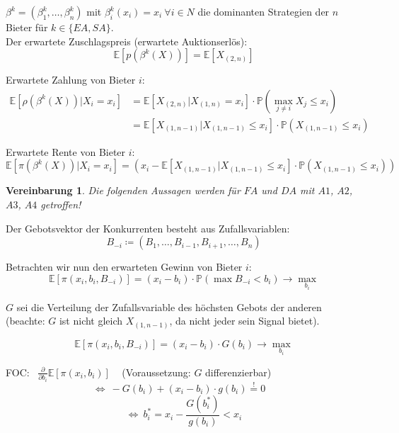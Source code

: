 \documentclass[12pt]{extreport} %
\theoremstyle{named}
\theoremstyle{nnamed}
\theoremstyle{itshape}
\theoremstyle{normal}
\newtheorem*{vereinbarung}{Vereinbarung}
\begin{document}
$\beta^{k} = \left(\beta_{1}^{k}, \dotsc, \beta_{n}^{k} \right)$ mit $\beta_{i}^{k}(x_{i}) = x_{i} ~\forall i \in N$ die dominanten Strategien der $n$ Bieter für $k \in \{ EA, SA \}$. \\

Der erwartete Zuschlagspreis (erwartete Auktionserlös):
	$$ \mathbb{E}\left[ p\left(\beta^{k}(X) \right) \right] = \mathbb{E}[X_{(2,n)}] $$
	
Erwartete Zahlung von Bieter $i$:
	\begin{align*}
		\mathbb{E}\left[ \rho\left( \beta^{k}(X) \right) \big| X_{i} = x_{i} \right] & = \mathbb{E}\left[ X_{(2,n)} \big| X_{(1, n)} = x_{i} \right] \cdot \mathbb{P}\left( \max_{j\neq i} X_{j} \leq x_{i} \right) \\
			& = \mathbb{E}\left[ X_{(1,n-1)} \big| X_{(1, n-1)} \leq x_{i} \right] \cdot \mathbb{P}\left( X_{(1, n-1)} \leq x_{i} \right)
	\end{align*}
	
Erwartete Rente von Bieter $i$:
$$ \mathbb{E}\left[ \pi\left( \beta^{k}(X) \right) \big| X_{i} = x_{i} \right] = \left( x_{i} - \mathbb{E} \left[ X_{(1, n-1)} \big| X_{(1, n-1)} \leq x_{i} \right] \cdot \mathbb{P}\left( X_{(1,n-1)} \leq x_{i} \right) \right) $$

\begin{vereinbarung}
	Die folgenden Aussagen werden für $FA$ und $DA$ mit $A1$, $A2$, $A3$, $A4$ getroffen!
\end{vereinbarung}

Der Gebotsvektor der Konkurrenten besteht aus Zufallsvariablen:
	$$ B_{-i} \coloneqq \left(B_{1}, \dotsc, B_{i-1}, B_{i+1}, \dotsc, B_{n} \right) $$

Betrachten wir nun den erwarteten Gewinn von Bieter $i$:
$$ \mathbb{E}[\pi\left( x_{i}, b_{i}, B_{-i} \right)] = (x_{i} - b_{i}) \cdot \mathbb{P}\left( \max B_{-i} < b_{i} \right) \longrightarrow \max_{b_{i}} $$

$G$ sei die Verteilung der Zufallsvariable des höchsten Gebots der anderen (beachte: $G$ ist nicht gleich $X_{(1, n-1)}$, da nicht jeder sein Signal bietet).

$$ \mathbb{E}[\pi\left( x_{i}, b_{i}, B_{-i} \right)] = (x_{i} - b_{i}) \cdot G(b_{i}) \longrightarrow \max_{b_{i}} $$

FOC: ~$\frac{\partial}{\partial b_{i}} \mathbb{E}\left[ \pi(x_{i}, b_{i} ) \right]$ ~ (Voraussetzung: $G$ differenzierbar)
$$ \iff ~ - G(b_{i}) + (x_{i} - b_{i}) \cdot g(b_{i}) \overset{!}{=} 0 \quad $$
$$ \iff ~ b_{i}^{*} = x_{i} - \frac{G(b_{i}^{*})}{g(b_{i})} < x_{i} $$
\end{document}
